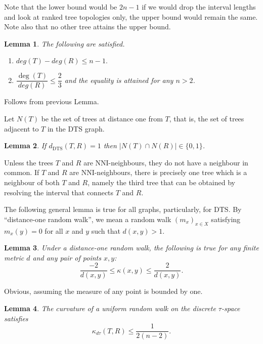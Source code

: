 \documentclass{amsart}
\newtheorem{lemma}{Lemma}
\newcommand{\dts}{\mathrm{DTS}}
\begin{document}
Note that the lower bound would be $2n-1$ if we would drop the interval lengths
and look at ranked tree topologies only, the upper bound would remain the same.
Note also that no other tree attains the upper bound. 

\begin{lemma} The following are satisfied. 
\begin{enumerate}[(1)]
\item $deg(T)-deg(R) \leq n-1.$
\item $\dfrac{\deg(T)}{deg(R)} \leq \dfrac23$ and the equality is attained for
any $n>2$. 
\end{enumerate}
\end{lemma}

\proof
Follows from previous Lemma. 
\endproof

Let $N(T)$ be the set of trees at distance one from $T$, that is, the set of
trees adjacent to $T$ in the $\dts$ graph. 

\begin{lemma}
If $d_{\dts}(T,R) = 1$ then $|N(T)\cap N(R)|\in\{0,1\}$.
\end{lemma}

\proof
Unless the trees $T$ and $R$ are NNI-neighbours, they do not have a neighbour in
common. If $T$ and $R$ are NNI-neighbours, there is precisely one tree which is
a neighbour of both $T$ and $R$, namely the third tree that can be obtained by
resolving the interval that connects $T$ and $R$. 
\endproof

The following general lemma is true for all graphs, particularly, for $\dts$. 
By ``distance-one random walk'', we mean a random walk $(m_x)_{x \in X}$ 
satisfying $m_x(y) = 0$ for all $x$ and $y$ such that $d(x,y) > 1$. 

\begin{lemma}
Under a distance-one random walk, the following is true for any finite 
metric $d$ and any pair of points $x,y$:
\[
\dfrac{-2}{d(x,y)} \leq \kappa(x,y) \leq \dfrac{2}{d(x,y)}.
\]
\end{lemma}

\proof
Obvious, assuming the measure of any point is bounded by one. 
\endproof

\begin{lemma}
The curvature of a uniform random walk on the discrete $\tau$-space satisfies 
\[
\kappa_{d\tau}(T,R) \leq 
\dfrac{1}{2(n-2)}.
\]
\end{lemma}
\end{document}
